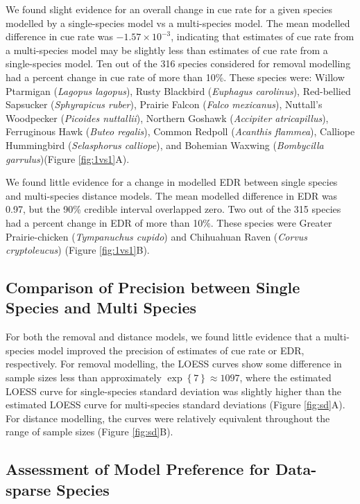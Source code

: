 \documentclass[12pt]{article}
\begin{document}
\par We found slight evidence for an overall change in cue rate for a given species modelled by a single-species model vs a multi-species model.
The mean modelled difference in cue rate was $-1.57 \times 10^{-3}$, indicating that estimates of cue rate from a multi-species model may be slightly less than estimates of cue rate from a single-species model.
Ten out of the 316 species considered for removal modelling had a percent change in cue rate of more than 10\%.
These species were: Willow Ptarmigan (\textit{Lagopus lagopus}), Rusty Blackbird (\textit{Euphagus carolinus}), Red-bellied Sapsucker (\textit{Sphyrapicus ruber}), Prairie Falcon (\textit{Falco mexicanus}), Nuttall's Woodpecker (\textit{Picoides nuttallii}), Northern Goshawk (\textit{Accipiter atricapillus}), Ferruginous Hawk (\textit{Buteo regalis}), Common Redpoll (\textit{Acanthis flammea}), Calliope Hummingbird (\textit{Selasphorus calliope}), and Bohemian Waxwing (\textit{Bombycilla garrulus})(Figure \ref{fig:1vs1}A).

\par We found little evidence for a change in modelled EDR between single species and multi-species distance models. 
The mean modelled difference in EDR was 0.97, but the 90\% credible interval overlapped zero.
Two out of the 315 species had a percent change in EDR of more than 10\%.
These species were Greater Prairie-chicken (\textit{Tympanuchus cupido}) and Chihuahuan Raven (\textit{Corvus cryptoleucus}) (Figure \ref{fig:1vs1}B).

\subsection{Comparison of Precision between Single Species and Multi Species}

\par For both the removal and distance models, we found little evidence that a multi-species model improved the precision of estimates of cue rate or EDR, respectively.
For removal modelling, the LOESS curves show some difference in sample sizes less than approximately $\exp\left\{7\right\} \approx 1097$, where the estimated LOESS curve for single-species standard deviation was slightly higher than the estimated LOESS curve for multi-species standard deviations (Figure \ref{fig:sd}A).
For distance modelling, the curves were relatively equivalent throughout the range of sample sizes (Figure \ref{fig:sd}B).

\subsection{Assessment of Model Preference for Data-sparse Species}
\end{document}

